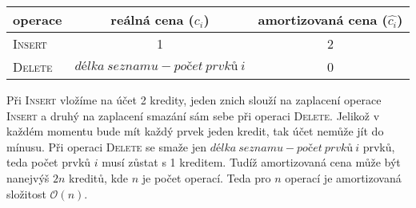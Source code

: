 \documentclass[12pt]{iv003}
\begin{document}
\begin{enumerate}
	\begin{center}
	\begin{tabular}{ l | c | c }
		operace 			&	reálná cena ($c_{i}$)	& 	amortizovaná cena ($\widehat{c_{i}}$) \\ \hline \hline
		\textsc{Insert} 	& 	1						&	2 \\
		\textsc{Delete}		&	$délka\ seznamu - počet\ prvků\ i$					&	0 \\ \hline 
	\end{tabular}
	\end{center}
	
	Při \textsc{Insert} vložíme na účet 2 kredity, jeden znich slouží na zaplacení operace \textsc{Insert} a druhý na zaplacení smazání sám sebe při operaci \textsc{Delete}. Jelikož v každém momentu bude mít každý prvek jeden kredit, tak účet nemůže jít do mínusu. Při operaci \textsc{Delete} se smaže jen $délka\ seznamu - počet\ prvků\ i$ prvků, teda počet prvků $i$ musí zůstat s 1 kreditem. Tudíž amortizovaná cena může být nanejvýš $2n$ kreditů, kde $n$ je počet operací. Teda pro $n$ operací je amortizovaná složitost $\mathcal{O}(n)$.
	
\end{enumerate}
\end{document}
